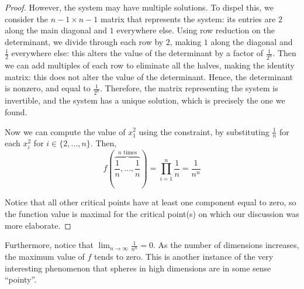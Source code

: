\documentclass[letterpaper,11pt]{article}
\newcommand{\parens}[1]{\left(#1\right)}
\begin{document}
\begin{proof}
  However, the system may have multiple solutions. To dispel this, we consider
  the $n-1 \times n-1$ matrix that represents the system: its entries are $2$
  along the main diagonal and $1$ everywhere else. Using row reduction on the
  determinant, we divide through each row by $2$, making $1$ along the diagonal
  and $\frac{1}{2}$ everywhere else: this alters the value of the determinant
  by a factor of $\frac{1}{2^n}$. Then we can add multiples of each row to
  eliminate all the halves, making the identity matrix: this does not alter the
  value of the determinant. Hence, the determinant is nonzero, and equal to
  $\frac{1}{2^n}$. Therefore, the matrix representing the system is invertible,
  and the system has a unique solution, which is precisely the one we found.

  Now we can compute the value of $x_1^2$ using the constraint, by substituting
  $\frac{1}{n}$ for each $x_i^2$ for $i \in \{2, \ldots, n\}$. Then,
  \begin{equation*}
    f\parens{\overbrace{\frac{1}{n}, \ldots, \frac{1}{n}}^\text{$n$ times}}
    = \prod_{i=1}^n \frac{1}{n} = \frac{1}{n^n}
  \end{equation*}

  Notice that all other critical points have at least one component equal to
  zero, so the function value is maximal for the critical point(s) on which our
  discussion was more elaborate.
\end{proof}

Furthermore, notice that $\lim_{n\to\infty} \frac{1}{n^n} = 0$. As the number
of dimensions increases, the maximum value of $f$ tends to zero. This is
another instance of the very interesting phenomenon that spheres in high
dimensions are in some sense ``pointy''.
\end{document}
